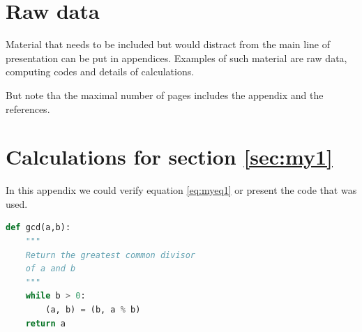 \documentclass{uonmathreport}
\begin{document}
\newpage

\appendix

\section{Raw data} \label{app:rawdata}

Material that needs to be included but would distract from the main
line of presentation can be put in appendices.
Examples of such material are raw
data, computing codes and details of calculations.

But note tha the maximal number of pages includes the appendix and the references.

\section{Calculations for section \ref{sec:my1}} \label{app:calculations}

In this appendix we could verify equation \eqref{eq:myeq1} or present the code that was used. 
\begin{lstlisting}[language=Python]
def gcd(a,b):
    """
    Return the greatest common divisor
    of a and b 
    """
    while b > 0:
        (a, b) = (b, a % b)
    return a
\end{lstlisting}
 
\newpage
\end{document}
